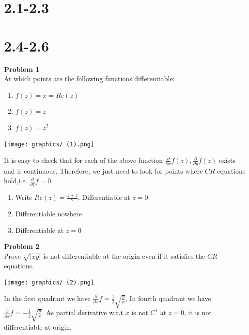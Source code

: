 \documentclass[12pt,oneside]{book}
\begin{document}
\section{2.1-2.3}

\begin{tcolorbox}[colback=blue!15]
    
\end{tcolorbox}


\section{2.4-2.6}

\begin{tcolorbox}[colback=blue!15]
    \textbf{Problem 1}\\
    At which points are the following functions differentiable:
    \begin{enumerate}
        \item $f(z)=x=Re(z)$
        \item $f(z)=\overline z$
        \item $f(z)=\overline z^2$
    \end{enumerate}
\end{tcolorbox}

\begin{marginfigure}%
    \texttt{[image: graphics/ (1).png]}
\end{marginfigure}%

It is easy to check that for each of the above function 
$\frac{\partial}{\partial x}f(z),\frac{\partial}{\partial y}f(z)$ exists and is continuous. Therefore, we just need to look for points where $CR$ equations hold,i.e. $\frac{\partial}{\partial\overline z}f=0$.
\begin{enumerate}
    \item Write $Re(z)=\frac{z+\overline z}{2}$. Differentiable at $z=0$
    \item Differentiable nowhere
    \item Differentiable at $z=0$
\end{enumerate}

\begin{tcolorbox}[colback=blue!15]
    \textbf{Problem 2}\\
    Prove $\sqrt{|xy|}$ is not differentiable at the origin even if it satisfies the $CR$ equations.
\end{tcolorbox}
\begin{marginfigure}%
    \texttt{[image: graphics/ (2).png]}
\end{marginfigure}%
In the first quadrant we have $\frac{\partial}{\partial x}f=\frac{1}{2}\sqrt{\frac{y}{x}}$. In fourth quadrant we have  $\frac{\partial}{\partial x}f=-\frac{1}{2}\sqrt{\frac{y}{x}}$. As partial derivative w.r.t $x$ is not $C^1$ at $z=0$, it is not differentiable at origin.
\end{document}
